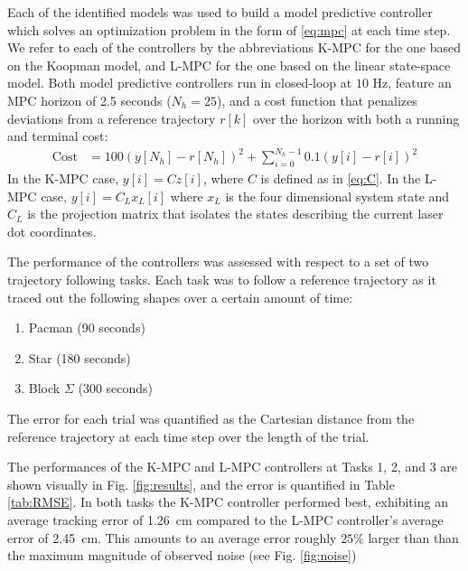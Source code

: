 Each of the identified models was used to build a model predictive controller which solves an optimization problem in the form of \eqref{eq:mpc} at each time step.
We refer to each of the controllers by the abbreviations K-MPC for the one based on the Koopman model, and L-MPC for the one based on the linear state-space model.
Both model predictive controllers run in closed-loop at $10$ Hz, feature an MPC horizon of 2.5 seconds ($N_h = 25$), and a cost function that penalizes deviations from a reference trajectory $r[k]$ over the horizon with both a running and terminal cost:
\begin{align}
    \text{Cost} &= 100 \left( y[N_h] - r[N_h] \right)^2 + \sum_{i=0}^{N_h - 1} 0.1 \left( y[i] - r[i] \right)^2
\end{align}
In the K-MPC case, $y[i] = C z[i]$, where $C$ is defined as in \eqref{eq:C}.
In the L-MPC case, $y[i] = C_L x_L[i]$ where $x_L$ is the four dimensional system state and $C_L$ is the projection matrix that isolates the states describing the current laser dot coordinates. 


The performance of the controllers was assessed with respect to a set of two trajectory following tasks.
Each task was to follow a reference trajectory as it traced out the following shapes over a certain amount of time:
\begin{enumerate}
    \item Pacman (90 seconds)
    \item Star (180 seconds)
    \item Block $\Sigma$ (300 seconds)
\end{enumerate}
The error for each trial was quantified as the Cartesian distance from the reference trajectory at each time step over the length of the trial.

The performances of the K-MPC and L-MPC controllers at Tasks 1, 2, and 3 are shown visually in Fig. \ref{fig:results}, and the error is quantified in Table \ref{tab:RMSE}.
In both tasks the K-MPC controller performed best, exhibiting an average tracking error of 1.26~cm compared to the L-MPC controller's average error of 2.45~cm.
This amounts to an average error roughly $25\%$ larger than than the maximum magnitude of observed noise (see Fig. \ref{fig:noise})



